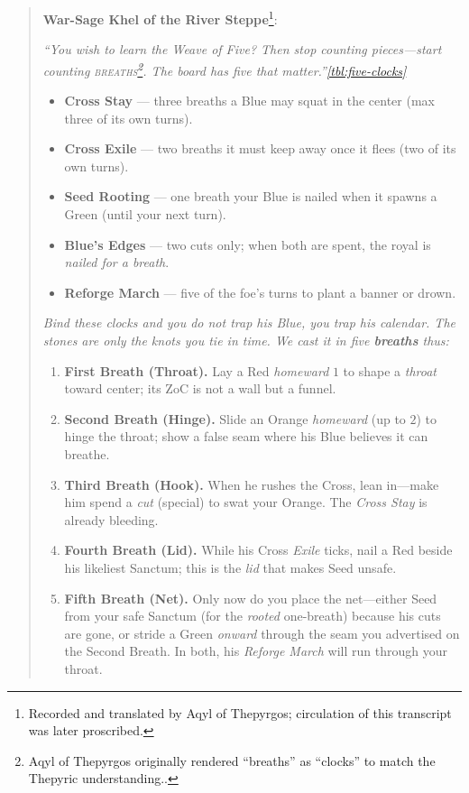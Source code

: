 \documentclass[11pt]{article}
\begin{document}
\begin{quote}\small
\textbf{War-Sage Khel of the River Steppe}\footnote{Recorded and translated by Aqyl of Thepyrgos; circulation of this transcript was later proscribed.}:

\medskip
\emph{“You wish to learn the Weave of Five? Then stop counting pieces—start counting \textsc{breaths}\footnote{Aqyl of Thepyrgos originally rendered “breaths” as “clocks” to match the Thepyric understanding..}. The board has five that matter.”\ref{tbl:five-clocks}}

\begin{itemize}
  \item \textbf{Cross Stay} — three breaths a Blue may squat in the center (max three of its own turns).
  \item \textbf{Cross Exile} — two breaths it must keep away once it flees (two of its own turns).
  \item \textbf{Seed Rooting} — one breath your Blue is nailed when it spawns a Green (until your next turn).
  \item \textbf{Blue’s Edges} — two cuts only; when both are spent, the royal is \emph{nailed for a breath}.
  \item \textbf{Reforge March} — five of the foe’s turns to plant a banner or drown.
\end{itemize}

\emph{Bind these clocks and you do not trap his Blue, you trap his calendar. The stones are only the knots you tie in time. We cast it in five \textbf{breaths} thus:}

\begin{enumerate}
  \item \textbf{First Breath (Throat).} Lay a Red \emph{homeward} $1$ to shape a \emph{throat} toward center; its ZoC is not a wall but a funnel.
  \item \textbf{Second Breath (Hinge).} Slide an Orange \emph{homeward} (up to $2$) to hinge the throat; show a false seam where his Blue believes it can breathe.
  \item \textbf{Third Breath (Hook).} When he rushes the Cross, lean in—make him spend a \emph{cut} (special) to swat your Orange. The \emph{Cross Stay} is already bleeding.
  \item \textbf{Fourth Breath (Lid).} While his Cross \emph{Exile} ticks, nail a Red beside his likeliest Sanctum; this is the \emph{lid} that makes Seed unsafe.
  \item \textbf{Fifth Breath (Net).} Only now do you place the net—either Seed from your safe Sanctum (for the \emph{rooted} one-breath) because his cuts are gone, or stride a Green \emph{onward} through the seam you advertised on the Second Breath. In both, his \emph{Reforge March} will run through your throat.
\end{enumerate}


\end{quote}
\end{document}
